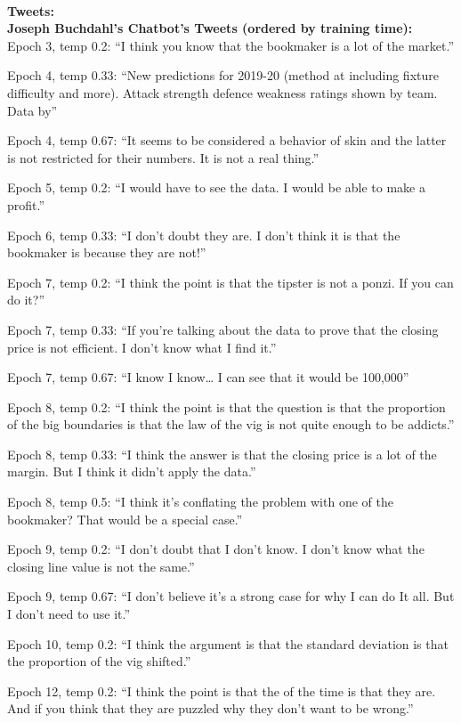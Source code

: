\documentclass[5p,authoryear]{elsarticle}
\begin{document}
{}\\
  
\textbf{Tweets:}\\


\textbf{Joseph Buchdahl’s Chatbot’s Tweets (ordered by training time):}\\

Epoch 3, temp 0.2: “I think you know that the bookmaker is a lot of the market.”

Epoch 4, temp 0.33: “New predictions for 2019-20 (method at including fixture difficulty and more). Attack strength defence weakness ratings shown by team. Data by”

Epoch 4, temp 0.67: “It seems to be considered a behavior of skin and the latter is not restricted for their numbers. It is not a real thing.”

Epoch 5, temp 0.2: “I would have to see the data. I would be able to make a profit.”

Epoch 6, temp 0.33: “I don’t doubt they are. I don’t think it is that the bookmaker is because they are not!”

Epoch 7, temp 0.2: “I think the point is that the tipster is not a ponzi. If you can do it?”

Epoch 7, temp 0.33: “If you’re talking about the data to prove that the closing price is not efficient. I don’t know what I find it.”

Epoch 7, temp 0.67: “I know I know… I can see that it would be 100,000”

Epoch 8, temp 0.2: “I think the point is that the question is that the proportion of the big boundaries is that the law of the vig is not quite enough to be addicts.”

Epoch 8, temp 0.33: “I think the answer is that the closing price is a lot of the margin. But I think it didn’t apply the data.”

Epoch 8, temp 0.5: “I think it’s conflating the problem with one of the bookmaker? That would be a special case.”

Epoch 9, temp 0.2: “I don’t doubt that I don’t know. I don’t know what the closing line value is not the same.”

Epoch 9, temp 0.67: “I don’t believe it’s a strong case for why I can do It all. But I don’t need to use it.”

Epoch 10, temp 0.2: “I think the argument is that the standard deviation is that the proportion of the vig shifted.”

Epoch 12, temp 0.2: “I think the point is that the of the time is that they are. And if you think that they are puzzled why they don’t want to be wrong.”
\end{document}
